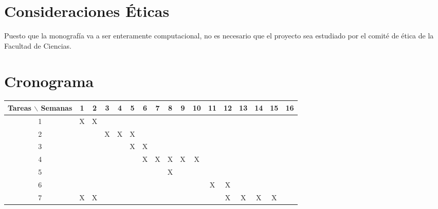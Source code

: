 \documentclass[12pt]{article}
\begin{document}
\section{Consideraciones \'Eticas}

Puesto que la monografía va a ser enteramente computacional, no es necesario que el proyecto sea estudiado por el comité de ética de la Facultad de Ciencias.



\section{Cronograma}

\begin{table}[htb]
	\begin{tabular}{|c|cccccccccccccccc| }
	\hline
	Tareas $\backslash$ Semanas & 1 & 2 & 3 & 4 & 5 & 6 & 7 & 8 & 9 & 10 & 11 & 12 & 13 & 14 & 15 & 16  \\
	\hline
	1 & X & X &   &    &   &   &   &   &   &   &   &   &   &   &   &   \\
	2 &   &   & X &  X & X &   &   &   &   &   &   &   &   &   &   &   \\
	3 &   &   &   &    & X &  X &  &  &   &   &   &   &   &   &   &   \\
	4 &   &   &   &    &   &   X & X & X & X & X &   &   &   &   &   &   \\
    5 &   &   &   &    &   &     &   & X &   &   &   &   &   &   &   &   \\
	6 &   &   &   &   &  &   &   &   &  &   &  X & X &   &   &  &   \\
    7 & X  &  X &   &   &  &   &   &   &   &   &   &  X&  X &  X &  X&   \\
	\hline
	\end{tabular}
\end{table}
\vspace{1mm}
\end{document}
